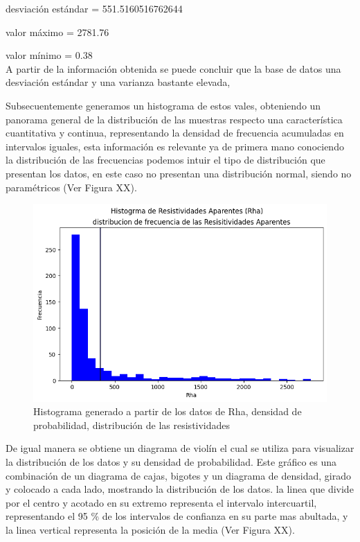\documentclass[sn-mathphys,Numbered]{sn-jnl}%
\theoremstyle{thmstyleone}%
\theoremstyle{thmstyletwo}%
\theoremstyle{thmstylethree}%
\begin{document}
desviación estándar = 551.5160516762644

valor máximo = 2781.76

valor mínimo = 0.38\\

A partir de la información obtenida se puede concluir que la base de datos una desviación estándar y una varianza bastante elevada,  

Subsecuentemente generamos un histograma de estos vales, obteniendo un panorama general de la distribución de las muestras respecto una característica cuantitativa y continua, representando la densidad de frecuencia acumuladas en intervalos iguales,\cite{Gutierrez2013} esta información es relevante ya de primera mano conociendo la distribución de las frecuencias podemos intuir el tipo de distribución que presentan los datos, en este caso no presentan una distribución normal, siendo no paramétricos (Ver Figura XX).

\begin{figure}[H]
	\centering
	\includegraphics[width=0.7\linewidth]{imagenes/Histograma_Rha}
	\caption[Figura]{Histograma generado a partir de los datos de Rha, densidad de probabilidad, distribución de las resistividades}
	\label{fig:histogramarha}
\end{figure}

De igual manera se obtiene un diagrama de violín el cual se utiliza para visualizar la distribución de los datos y su densidad de probabilidad. Este gráfico es una combinación de un diagrama de cajas, bigotes y un diagrama de densidad, girado y colocado a cada lado, mostrando la distribución de los datos. la linea que divide por el centro y acotado en su extremo representa el intervalo intercuartil, representando el 95 \% de los intervalos de confianza en su parte mas abultada, y la linea vertical representa la posición de la media (Ver Figura XX).
\end{document}
